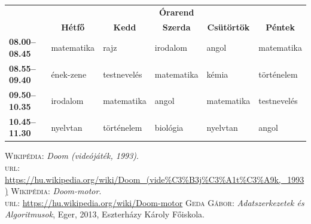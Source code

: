 \documentclass{thesis-ekf}
\theoremstyle{definition}
\begin{document}
\begin{table}[h]
    \centering
    \footnotesize
    \begin{tabular}{|>{\bfseries}l|l|l|l|l|l|}
        \cline{2-6}
        \multicolumn{1}{c|}{} &
        \multicolumn{5}{c|}{\textbf{Órarend}}\\
        \cline{2-6}
        \multicolumn{1}{c|}{} &
        \multicolumn{1}{c|}{\textbf{Hétfő}} &
        \multicolumn{1}{c|}{\textbf{Kedd}} &
        \multicolumn{1}{c|}{\textbf{Szerda}} &
        \multicolumn{1}{c|}{\textbf{Csütörtök}} &
        \multicolumn{1}{c|}{\textbf{Péntek}}\\
        \hline
        08.00--08.45 &
        matematika &
        rajz &
        irodalom &
        angol &
        matematika\\
        \hline
        08.55--09.40 &
        ének-zene &
        testnevelés &
        matematika &
        kémia &
        történelem\\
        \hline
        09.50--10.35 &
        irodalom &
        matematika &
        angol &
        matematika &
        testnevelés\\
        \hline
        10.45--11.30 &
        nyelvtan &
        történelem &
        biológia &
        nyelvtan &
        angol\\
        \hline
    \end{tabular}
\end{table}

\begin{thebibliography}{2}
     \textsc{Wikipédia}: \emph{Doom (videójáték, 1993)}.\\
    \textsc{url}:
    \url{https://hu.wikipedia.org/wiki/Doom_(vide%C3%B3j%C3%A1t%C3%A9k,_1993)}
     \textsc{Wikipédia}: \emph{Doom-motor}.\\\textsc{url}:
    \url{https://hu.wikipedia.org/wiki/Doom-motor}
     \textsc{Geda Gábor}: \emph{Adatszerkezetek és Algoritmusok},
    Eger, 2013, Eszterházy Károly Főiskola.
\end{thebibliography}
\end{document}
